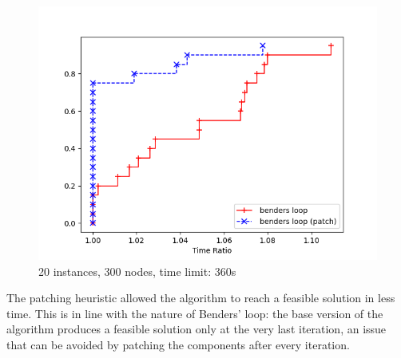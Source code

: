 \FloatBarrier
\begin{figure}[h]
    \centering
    \includegraphics*[width=.6\textwidth]{../plots/perfprof_benders_times.png}
    \caption*{20 instances, 300 nodes, time limit: 360s}
\end{figure}
\FloatBarrier

The patching heuristic allowed the algorithm to reach a feasible solution in less time. This is in line with the nature of Benders' loop: the base version of the algorithm produces a feasible solution only at the very last iteration, an issue that can be avoided by patching the components after every iteration.